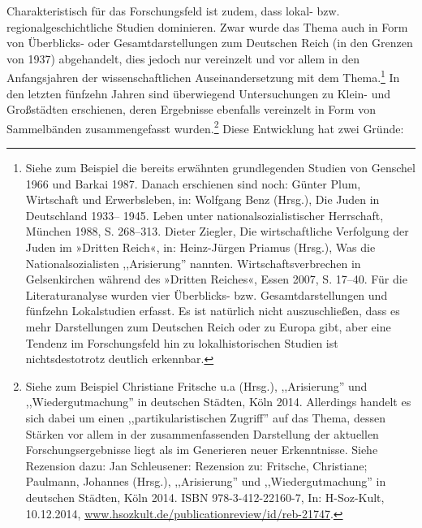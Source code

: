 Charakteristisch für das Forschungsfeld ist zudem, dass lokal- bzw. regionalgeschichtliche Studien dominieren. Zwar wurde das Thema auch in Form von Überblicks- oder Gesamtdarstellungen zum Deutschen Reich (in den Grenzen von 1937) abgehandelt, dies jedoch nur vereinzelt und vor allem in den Anfangsjahren der wissenschaftlichen Auseinandersetzung mit dem Thema.\footnote{Siehe zum Beispiel die bereits erwähnten grundlegenden Studien von Genschel 1966 und Barkai 1987. Danach erschienen sind noch: Günter
Plum, Wirtschaft und Erwerbsleben, in: Wolfgang Benz (Hrsg.), Die Juden in Deutschland 1933–
1945. Leben unter nationalsozialistischer Herrschaft, München 1988, S. 268–313. Dieter Ziegler, Die wirtschaftliche
Verfolgung der Juden im »Dritten Reich«, in: Heinz-Jürgen Priamus (Hrsg.), Was die
Nationalsozialisten ,,Arisierung'' nannten. Wirtschaftsverbrechen in Gelsenkirchen während des
»Dritten Reiches«, Essen 2007, S. 17–40. Für die Literaturanalyse wurden vier Überblicks- bzw. Gesamtdarstellungen und fünfzehn Lokalstudien erfasst. Es ist natürlich nicht auszuschließen, dass es mehr Darstellungen zum Deutschen Reich oder zu Europa gibt, aber eine Tendenz im Forschungsfeld hin zu lokalhistorischen Studien ist nichtsdestotrotz deutlich erkennbar.} In den letzten fünfzehn Jahren sind überwiegend Untersuchungen zu Klein- und Großstädten erschienen, deren Ergebnisse ebenfalls vereinzelt in Form von Sammelbänden zusammengefasst wurden.\footnote{Siehe zum Beispiel Christiane Fritsche u.a (Hrsg.), ,,Arisierung'' und ,,Wiedergutmachung'' in deutschen Städten, Köln 2014. Allerdings handelt es sich dabei um einen ,,partikularistischen Zugriff'' auf das Thema, dessen Stärken vor allem in der zusammenfassenden Darstellung der aktuellen Forschungsergebnisse liegt als im Generieren neuer Erkenntnisse. Siehe Rezension dazu: Jan Schleusener: Rezension zu: Fritsche, Christiane; Paulmann, Johannes (Hrsg.), ,,Arisierung'' und ,,Wiedergutmachung'' in deutschen Städten, Köln  2014. ISBN 978-3-412-22160-7, In: H-Soz-Kult, 10.12.2014, \url{www.hsozkult.de/publicationreview/id/reb-21747}.} Diese Entwicklung hat zwei Gründe:

